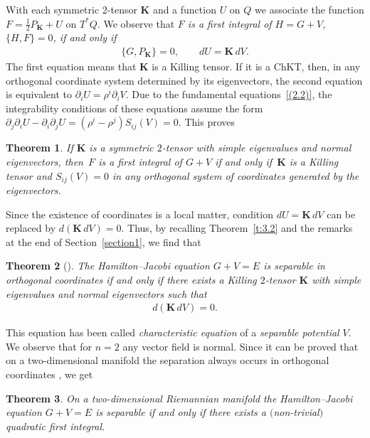 \documentclass[pdftex]{sigma}
\def\bs{\boldsymbol}
\numberwithin{equation}{section}
\newtheorem{Theorem}{Theorem}[section]
 { \theoremstyle{definition}
\newtheorem{Notation}[Theorem]{Notation}
\newtheorem{Example}[Theorem]{Example}
\newtheorem{Remark}[Theorem]{Remark}
\newtheorem{Remarks}[Theorem]{Remarks}
 }
\begin{document}
With each symmetric 2-tensor $\bs K$ and a function $U$ on $Q$ we associate the function $F=\tfrac 12  P_{\bs K}+U$ on $T^*Q$. We observe that {\it $F$ is a first integral of $H=G+V$, $\{H,F\}=0$, if and only if}
\begin{gather*}
\{G,P_{\bs K}\}=0, \qquad dU=\bs K\,dV.
\end{gather*}
The f\/irst equation means that $\bs K$ is a Killing tensor. If it is a ChKT, then, in any orthogonal coordinate system determined by its eigenvectors, the second equation is equivalent to $\partial_iU=\rho^i\partial_iV$.
Due to the fundamental equations~\eqref{(2.2)}, the integrability conditions of these equations assume the form
$\partial_j\partial_iU-\partial_i\partial_jU=(\rho^i-\rho^j) S_{ij}(V)=0$. This proves

\begin{Theorem}\label{t:4.1}
If $\bs K$ is a symmetric $2$-tensor with simple eigenvalues and normal eigenvectors, then~$F$ is a first integral of $G+V$ if and only if~$\bs K$ is a Killing tensor and $S_{ij}(V)=0$ in any orthogonal system of coordinates generated by the eigenvectors.
\end{Theorem}

Since the existence of coordinates is a local matter, condition $d U=\bs K\,dV$ can be replaced by $d(\bs K\,dV)=0$. Thus, by recalling Theorem~\ref{t:3.2}  and the remarks at the end of Section~\ref{section1},  we f\/ind that

\begin{Theorem}[\cite{Benenti-1993}]\label{t:4.2}
The Hamilton--Jacobi equation $G+V=E$ is separable in orthogonal coordinates if and only if there exists a Killing $2$-tensor $\bs K$ with simple eigenvalues and normal eigenvectors such that
\begin{gather}
d(\bs K\,dV)=0.
\label{(4.1)}
\end{gather}
\end{Theorem}

This equation has been called {\it characteristic equation} of a {\it separable potential} $V$.
We observe that for $n=2$ any vector f\/ield is normal. Since it can be proved that on a two-dimensional manifold the separation always occurs in orthogonal coordinates \cite{LC-1904}, we get

\begin{Theorem}\label{t:4.3}\sloppy
On a two-dimensional Riemannian manifold the Hamilton--Jacobi equation \mbox{$G+V=E$} is separable if and only if there exists a $($non-trivial$)$ quadratic first integral.
\end{Theorem}
\end{document}
